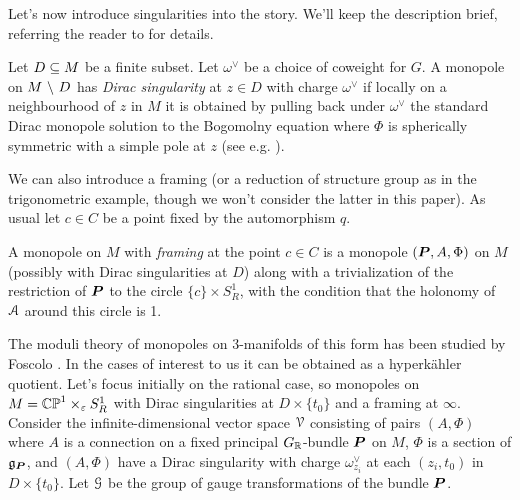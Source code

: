 \documentclass[10pt, oneside]{article}
\begin{document}
Let's now introduce singularities into the story.  We'll keep the description brief, referring the reader to \cite{CharbonneauHurtubise, Smith} for details.
\begin{definition}
  Let $D \subseteq M$ be a finite subset.  Let $\omega^\vee$ be a choice of coweight for $G$.  A monopole on $M \ \backslash \  D$ has \emph{Dirac singularity} at $z \in D$ with charge $\omega^\vee$ if locally on a neighbourhood of $z$ in $M$ it is obtained by pulling back under $\omega^\vee$ the standard Dirac monopole solution to the Bogomolny equation where $\Phi$ is spherically symmetric with a simple pole at $z$ (see e.g. \cite[Section 2.2]{CharbonneauHurtubise}).
\end{definition}

We can also introduce a framing (or a reduction of structure group as in the trigonometric example, though we won't consider the latter in this paper).  As usual let $c \in C$ be a point fixed by the automorphism $q$.
\begin{definition}
  A monopole on $M$ with \emph{framing} at the point $c \in C$ is a monopole $(\boldsymbol{P},A,\Phi)$ on $M$ (possibly with Dirac singularities at $D$) along with a trivialization of the restriction of $\boldsymbol{P}$ to the circle $\{c\} \times S^1_R$, with the condition that the holonomy of $\mathcal{A}$ around this circle is 1.
\end{definition}

The moduli theory of monopoles on 3-manifolds of this form has been studied by Foscolo \cite{FoscoloDef}.   In the cases of interest to us it can be obtained as a hyperk\"ahler quotient.  Let's focus initially on the rational case, so monopoles on $M = \mathbb{CP}^1 \times_\varepsilon S^1_R$ with Dirac singularities at $D \times \{t_0\}$ and a framing at $\infty$.  Consider the infinite-dimensional vector space $\mathcal{V}$ consisting of pairs $(A,\Phi)$ where $A$ is a connection on a fixed principal $G_{\mathbb{R}}$-bundle $\boldsymbol{P}$ on $M$, $\Phi$ is a section of $\mathfrak{g}_{\boldsymbol{P}}$, and $(A,\Phi)$ have a Dirac singularity with charge $\omega^\vee_{z_i}$ at each $(z_i,t_0)$ in $D \times \{t_0\}$.  Let $\mathcal{G}$ be the group of gauge transformations of the bundle $\boldsymbol{P}$.
\end{document}
